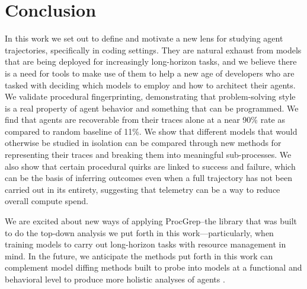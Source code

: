 \documentclass[11pt]{article}
\begin{document}

  \section{Conclusion}

  In this work we set out to define and motivate a new lens for studying agent trajectories, specifically in coding settings. They are natural
  exhaust from models that are being deployed for increasingly long-horizon tasks, and we believe there is a need for tools to make use of them
  to help a new age of developers who are tasked with deciding which models to employ and how to architect their agents. We validate procedural
  fingerprinting, demonstrating that problem-solving style is a real property of agent behavior and something that can be programmed. We find
  that agents are recoverable from their traces alone at a near 90\% rate as compared to random baseline of 11\%. We show that different models
  that would otherwise be studied in isolation can be compared through new methods for representing their traces and breaking them into
  meaningful sub-processes. We also show that certain procedural quirks are linked to success and failure, which can be the basis of inferring
  outcomes even when a full trajectory has not been carried out in its entirety, suggesting that telemetry can be a way to reduce overall
  compute spend.

  We are excited about new ways of applying ProcGrep--the library that was built to do the top-down analysis we put forth in this
  work---particularly, when training models to carry out long-horizon tasks with resource management in mind. In the future, we anticipate the
  methods put forth in this work can complement model diffing methods built to probe into models at a functional and behavioral level to produce
  more holistic analyses of agents \citep{jiralerspong2026crossarchitecturemodeldiffingcrosscoders, aranguri2025modeldiff}.

\end{document}

